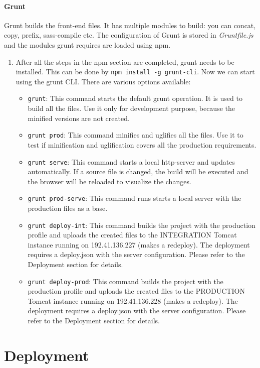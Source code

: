 \paragraph{Grunt}
Grunt builds the front-end files. It has multiple modules to build: you can concat, copy, prefix, sass-compile etc. The configuration of Grunt is stored in \textit{Gruntfile.js} and the modules grunt requires are loaded using npm.
\begin{enumerate}
  \item After all the steps in the npm section are completed, grunt needs to be installed. This can be done by \texttt{npm install -g grunt-cli}. Now we can start using the grunt CLI. There are various options available:
  \begin{itemize}
	\item \texttt{grunt}: This command starts the default grunt operation. It is used to build all the files. Use it only for development purpose, because the minified versions are not created.
	\item \texttt{grunt prod}: This command minifies and uglifies all the files. Use it to test if minification and uglification covers all the production requirements.
	\item \texttt{grunt serve}: This command starts a local http-server and updates automatically. If a source file is changed, the build will be executed and the browser will be reloaded to visualize the changes.
	\item \texttt{grunt prod-serve}: This command runs starts a local server with the production files as a base.
	\item \texttt{grunt deploy-int}: This command builds the project with the production profile and uploads the created files to the INTEGRATION Tomcat instance running on 192.41.136.227 (makes a redeploy). The deployment requires a deploy.json with the server configuration. Please refer to the Deployment section for details.
	\item \texttt{grunt deploy-prod}: This command builds the project with the production profile and uploads the created files to the PRODUCTION Tomcat instance running on 192.41.136.228 (makes a redeploy). The deployment requires a deploy.json with the server configuration. Please refer to the Deployment section for details.
    \end{itemize}
\end{enumerate}

\section{Deployment}

